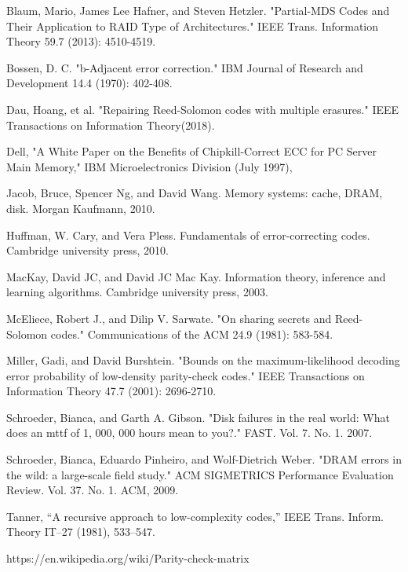 \documentclass[letterpaper, 10 pt, conference]{ieeeconf}
\begin{document}
\begin{thebibliography}{99}

 Blaum, Mario, James Lee Hafner, and Steven Hetzler. "Partial-MDS Codes and Their Application to RAID Type of Architectures." IEEE Trans. Information Theory 59.7 (2013): 4510-4519.​

 Bossen, D. C. "b-Adjacent error correction." IBM Journal of Research and Development 14.4 (1970): 402-408.​

 Dau, Hoang, et al. "Repairing Reed-Solomon codes with multiple erasures." IEEE Transactions on Information Theory(2018).​

 Dell, "A White Paper on the Benefits of Chipkill-Correct ECC for PC Server Main Memory," IBM Microelectronics Division (July 1997),​

 Jacob, Bruce, Spencer Ng, and David Wang. Memory systems: cache, DRAM, disk. Morgan Kaufmann, 2010.​

 Huffman, W. Cary, and Vera Pless. Fundamentals of error-correcting codes. Cambridge university press, 2010.​

 MacKay, David JC, and David JC Mac Kay. Information theory, inference and learning algorithms. Cambridge university press, 2003.

 McEliece, Robert J., and Dilip V. Sarwate. "On sharing secrets and Reed-Solomon codes." Communications of the ACM 24.9 (1981): 583-584.

 Miller, Gadi, and David Burshtein. "Bounds on the maximum-likelihood decoding error probability of low-density parity-check codes." IEEE Transactions on Information Theory 47.7 (2001): 2696-2710.​

 Schroeder, Bianca, and Garth A. Gibson. "Disk failures in the real world: What does an mttf of 1, 000, 000 hours mean to you?." FAST. Vol. 7. No. 1. 2007.​

 Schroeder, Bianca, Eduardo Pinheiro, and Wolf-Dietrich Weber. "DRAM errors in the wild: a large-scale field study." ACM SIGMETRICS Performance Evaluation Review. Vol. 37. No. 1. ACM, 2009.

 Tanner, “A recursive approach to low-complexity codes,” IEEE Trans. Inform. Theory
IT–27 (1981), 533–547.

 https://en.wikipedia.org/wiki/Parity-check-matrix

\end{thebibliography}
\end{document}

